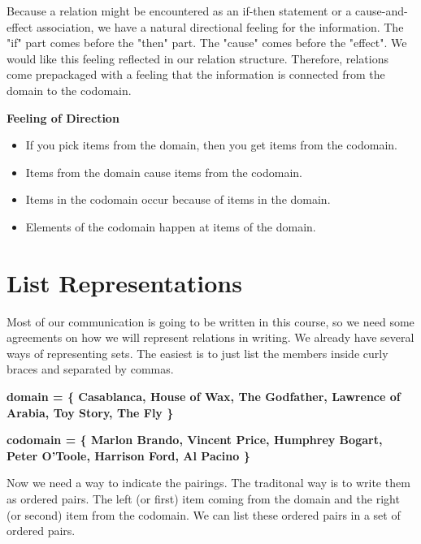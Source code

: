 \documentclass{ximera}
\begin{document}
Because a relation might be encountered as an if-then statement or a cause-and-effect association, we have a natural directional feeling for the information.  The "if" part comes before the "then" part.  The "cause" comes before the "effect".  We would like this feeling reflected in our relation structure.  Therefore, relations come prepackaged with a feeling that the information is connected from the domain to the codomain.



\textbf{\textcolor{red!50!blue!50!}{Feeling of Direction}}
\begin{itemize}
\item If you pick items from the domain, then you get items from the codomain.
\item Items from the domain cause items from the codomain.
\item Items in the codomain occur because of items in the domain.
\item Elements of the codomain happen at items of the domain.
\end{itemize}



\section{List Representations}

Most of our communication is going to be written in this course, so we need some agreements on how we will represent relations in writing.  We already have several ways of representing sets.  The easiest is to just list the members inside curly braces and separated by commas.

\begin{center} 
\textbf{\textcolor{red!25!blue!75!}{ domain = \{ Casablanca, House of Wax,  The Godfather, Lawrence of Arabia, Toy Story, The Fly \} }}
\end{center}

\begin{center} 
\textbf{\textcolor{red!25!blue!75!}{ codomain = \{ Marlon Brando, Vincent Price, Humphrey Bogart, Peter O'Toole, Harrison Ford, Al Pacino \} }}
\end{center}

Now we need a way to indicate the pairings.  The traditonal way is to write them as ordered pairs.  The left (or first) item coming from the domain and the right (or second) item from the codomain.  We can list these ordered pairs in a set of ordered pairs. 
\end{document}
